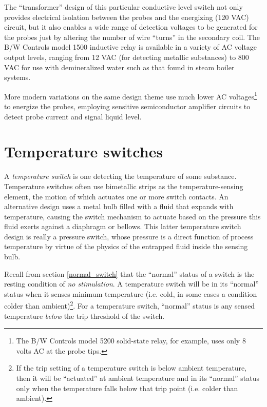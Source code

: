 The ``transformer'' design of this particular conductive level switch not only provides electrical isolation between the probes and the energizing (120 VAC) circuit, but it also enables a wide range of detection voltages to be generated for the probes just by altering the number of wire ``turns'' in the secondary coil.  The B/W Controls model 1500 inductive relay is available in a variety of AC voltage output levels, ranging from 12 VAC (for detecting metallic substances) to 800 VAC for use with demineralized water such as that found in steam boiler systems.

\vskip 10pt

More modern variations on the same design theme use much lower AC voltages\footnote{The B/W Controls model 5200 solid-state relay, for example, uses only 8 volts AC at the probe tips.} to energize the probes, employing sensitive semiconductor amplifier circuits to detect probe current and signal liquid level.













\filbreak
\section{Temperature switches}

A \textit{temperature switch} is one detecting the temperature of some substance.  Temperature switches often use bimetallic strips as the temperature-sensing element, the motion of which actuates one or more switch contacts.  An alternative design uses a metal bulb filled with a fluid that expands with temperature, causing the switch mechanism to actuate based on the pressure this fluid exerts against a diaphragm or bellows.  This latter temperature switch design is really a pressure switch, whose pressure is a direct function of process temperature by virtue of the physics of the entrapped fluid inside the sensing bulb. 

Recall from section \ref{normal_switch} that the ``normal'' status of a switch is the resting condition of \textit{no stimulation}.  A temperature switch will be in its ``normal'' status when it senses minimum temperature (i.e. cold, in some cases a condition colder than ambient)\footnote{If the trip setting of a temperature switch is below ambient temperature, then it will be ``actuated'' at ambient temperature and in its ``normal'' status only when the temperature falls below that trip point (i.e. colder than ambient).}.  For a temperature switch, ``normal'' status is any sensed temperature \textit{below} the trip threshold of the switch.  

